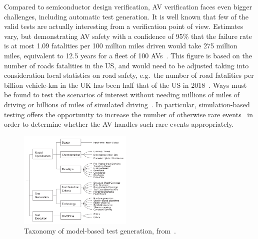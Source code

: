 \documentclass[letterpaper, 10 pt, journal, twoside]{IEEEtran}
\begin{document}
Compared to semiconductor design verification, AV verification faces even bigger challenges, including automatic test generation. 
%
It is well known that few of the valid tests are actually interesting from a verification point of view. 
Estimates vary, but demonstrating AV safety with a confidence of 95\% that the failure rate is at most 1.09 fatalities per 100 million miles driven would take 275 million miles, equivalent to 12.5 years for a fleet of 100 AVs~\cite{kalra2016driving}. %
%
This figure is based on the number of roads fatalities in the US, and would
need to be adjusted taking into consideration local statistics on road safety,
e.g.\ the number of road fatalities per billion vehicle-km in the UK has been
half that of the US in 2018~\cite{ITFroadSafety2018}.
%
Ways must be found to test the scenarios of interest without needing millions of miles of driving or billions of miles of simulated driving~\cite{korosec2019waymo}.
%
In particular, simulation-based testing offers the opportunity to increase the number of otherwise rare events~\cite{Koopman2018} in order to determine whether the AV handles such rare events appropriately. 
%
%


\begin{figure}[!t]
	\centering
\includegraphics[width=0.48\textwidth]{taxonomy.png}
	\caption{Taxonomy of model-based test generation, from~\cite{utting2012taxonomy}.}
	\label{f:taxonomy}
\end{figure}
\end{document}
